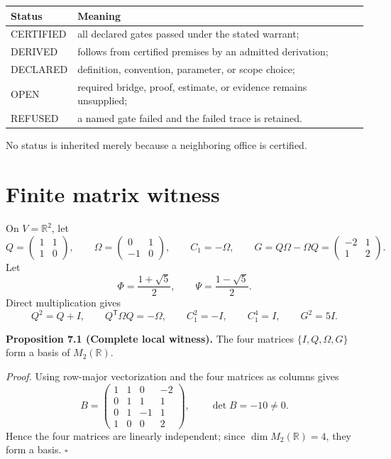 \documentclass[11pt]{article}
\begin{document}
\begin{center}
\begin{tabular}{@{}ll@{}}
\toprule
\textbf{Status} & \textbf{Meaning}\\
\midrule
\textsf{CERTIFIED} & all declared gates passed under the stated warrant;\\
\textsf{DERIVED} & follows from certified premises by an admitted derivation;\\
\textsf{DECLARED} & definition, convention, parameter, or scope choice;\\
\textsf{OPEN} & required bridge, proof, estimate, or evidence remains unsupplied;\\
\textsf{REFUSED} & a named gate failed and the failed trace is retained.\\
\bottomrule
\end{tabular}
\end{center}

No status is inherited merely because a neighboring office is certified.

\section{Finite matrix witness}

On $V=\mathbb R^2$, let
\[
Q=
\begin{pmatrix}1&1\\1&0\end{pmatrix},
\qquad
\Omega=
\begin{pmatrix}0&1\\-1&0\end{pmatrix},
\qquad
C_1=-\Omega,
\qquad
G=Q\Omega-\Omega Q
=
\begin{pmatrix}-2&1\\1&2\end{pmatrix}.
\]
Let
\[
\Phi=\frac{1+\sqrt5}{2},
\qquad
\Psi=\frac{1-\sqrt5}{2}.
\]
Direct multiplication gives
\[
Q^2=Q+I,
\qquad
Q^{\mathsf T}\Omega Q=-\Omega,
\qquad
C_1^2=-I,
\qquad
C_1^4=I,
\qquad
G^2=5I.
\]

\textbf{Proposition 7.1 (Complete local witness).}
The four matrices $\{I,Q,\Omega,G\}$ form a basis of $M_2(\mathbb R)$.

\textit{Proof.}
Using row-major vectorization and the four matrices as columns gives
\[
B=
\begin{pmatrix}
1&1&0&-2\\
0&1&1&1\\
0&1&-1&1\\
1&0&0&2
\end{pmatrix},
\qquad
\det B=-10\neq0.
\]
Hence the four matrices are linearly independent; since $\dim M_2(\mathbb R)=4$, they form a basis. \hfill$\square$
\end{document}
